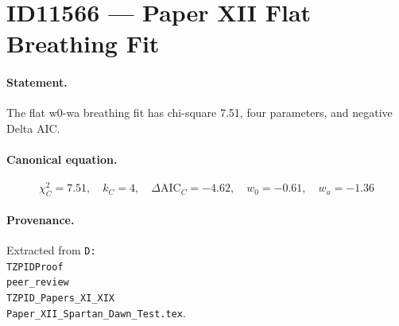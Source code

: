 \section*{ID11566 --- Paper XII Flat Breathing Fit}

\paragraph{Statement.}
The flat w0-wa breathing fit has chi-square 7.51, four parameters, and negative Delta AIC.

\paragraph{Canonical equation.}
\[
\chi^2_C=7.51,\quad k_C=4,\quad\Delta\mathrm{AIC}_C=-4.62,\quad w_0=-0.61,\quad w_a=-1.36
\]

\paragraph{Provenance.}
Extracted from \texttt{D:\\TZPIDProof\\peer\_review\\TZPID\_Papers\_XI\_XIX\\Paper\_XII\_Spartan\_Dawn\_Test.tex}.
